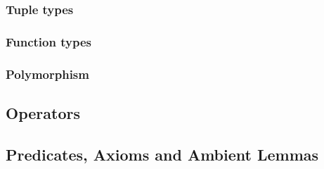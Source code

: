 \subsubsection*{Tuple types}

\subsubsection*{Function types}

\subsubsection*{Polymorphism}


\subsection{Operators}

\subsection{Predicates, Axioms and Ambient Lemmas}

